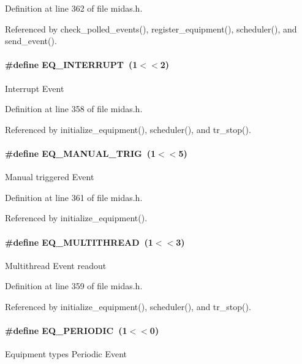 Definition at line 362 of file midas.h.

Referenced by check\_\-polled\_\-events(), register\_\-equipment(), scheduler(), and send\_\-event().
\paragraph[{EQ\_\-INTERRUPT}]{\setlength{\rightskip}{0pt plus 5cm}\#define EQ\_\-INTERRUPT~(1$<$$<$2)}\hfill\label{group__mdefineh_gad5ba2ec0f5d55139048dbe2d416da6ba}
Interrupt Event 

Definition at line 358 of file midas.h.

Referenced by initialize\_\-equipment(), scheduler(), and tr\_\-stop().
\paragraph[{EQ\_\-MANUAL\_\-TRIG}]{\setlength{\rightskip}{0pt plus 5cm}\#define EQ\_\-MANUAL\_\-TRIG~(1$<$$<$5)}\hfill\label{group__mdefineh_gac73e1045dff2b724325100af2e946717}
Manual triggered Event 

Definition at line 361 of file midas.h.

Referenced by initialize\_\-equipment().
\paragraph[{EQ\_\-MULTITHREAD}]{\setlength{\rightskip}{0pt plus 5cm}\#define EQ\_\-MULTITHREAD~(1$<$$<$3)}\hfill\label{group__mdefineh_ga7cc85959e8d0c4e476cf659c2cee7a33}
Multithread Event readout 

Definition at line 359 of file midas.h.

Referenced by initialize\_\-equipment(), scheduler(), and tr\_\-stop().
\paragraph[{EQ\_\-PERIODIC}]{\setlength{\rightskip}{0pt plus 5cm}\#define EQ\_\-PERIODIC~(1$<$$<$0)}\hfill\label{group__mdefineh_ga58e919e4e401b299c1834be965c3e78c}
Equipment types Periodic Event 

